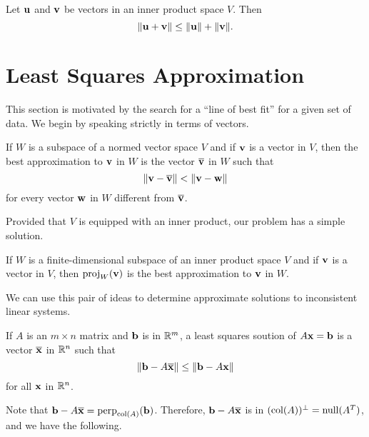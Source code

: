 \documentclass[../m073main.tex]{subfiles}
\begin{document}
\begin{theorem}
	Let $\mathbf{u}$ and $\mathbf{v}$ be vectors in an inner product space $V$.
	Then
	\[ \|\mathbf{u} + \mathbf{v}\| \leq \|\mathbf{u}\| + \|\mathbf{v}\|. \]
\end{theorem}

\section{Least Squares Approximation}
This section is motivated by the search for a ``line of best fit'' for a given set of data.
We begin by speaking strictly in terms of vectors.

\begin{definition}
	If $W$ is a subspace of a normed vector space $V$ and if $\mathbf{v}$ is a vector in $V$, then the best approximation to $\mathbf{v}$ in $W$ is the vector $\overline{\mathbf{v}}$ in $W$ such that
	\[ \|\mathbf{v} - \overline{\mathbf{v}}\| < \|\mathbf{v} - \mathbf{w}\| \]
	for every vector $\mathbf{w}$ in $W$ different from $\overline{\mathbf{v}}$.
\end{definition}

Provided that $V$ is equipped with an inner product, our problem has a simple solution.

\begin{theorem}
	If $W$ is a finite-dimensional subspace of an inner product space $V$ and if $\mathbf{v}$ is a vector in $V$, then $\textrm{proj}_W(\mathbf{v})$ is the best approximation to $\mathbf{v}$ in $W$.
\end{theorem}

We can use this pair of ideas to determine approximate solutions to inconsistent linear systems.

\begin{definition}
	If $A$ is an $m \times n$ matrix and $\mathbf{b}$ is in $\mathbb{R}^m$, a least squares soution of $A \mathbf{x} = \mathbf{b}$ is a vector $\overline{\mathbf{x}}$ in $\mathbb{R}^n$ such that
	\[ \|\mathbf{b} - A \overline{\mathbf{x}}\| \leq \|\mathbf{b} - A \mathbf{x}\| \]
	for all $\mathbf{x}$ in $\mathbb{R}^n$.
\end{definition}

Note that $\mathbf{b} - A \overline{\mathbf{x}} = \textrm{perp}_{\textrm{col}(A)}(\mathbf{b})$.
Therefore, $\mathbf{b} - A \overline{\mathbf{x}}$ is in $(\textrm{col}(A))^\perp = \textrm{null}(A^T)$, and we have the following.
\end{document}
